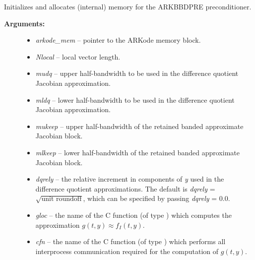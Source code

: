 \documentclass[letterpaper,10pt,english]{sphinxmanual}
\begin{document}
\begin{fulllineitems}
\label{c_interface/Preconditioners:c.ARKBBDPrecInit}
Initializes and allocates (internal) memory for the
ARKBBDPRE preconditioner.
\begin{description}
\item[{\textbf{Arguments:}}] \leavevmode\begin{itemize}
\item {} 
\emph{arkode\_mem} -- pointer to the ARKode memory block.

\item {} 
\emph{Nlocal} -- local vector length.

\item {} 
\emph{mudq} -- upper half-bandwidth to be used in the difference
quotient Jacobian approximation.

\item {} 
\emph{mldq} -- lower half-bandwidth to be used in the difference
quotient Jacobian approximation.

\item {} 
\emph{mukeep} -- upper half-bandwidth of the retained banded
approximate Jacobian block.

\item {} 
\emph{mlkeep} -- lower half-bandwidth of the retained banded
approximate Jacobian block.

\item {} 
\emph{dqrely} -- the relative increment in components of \emph{y} used in
the difference quotient approximations.  The default is \emph{dqrely}
= \(\sqrt{\text{unit roundoff}}\), which can be specified by
passing \emph{dqrely} = 0.0.

\item {} 
\emph{gloc} -- the name of the C function (of type {\hyperref[c_interface/Preconditioners:c.ARKLocalFn]{\emph{}}})
which computes the approximation \(g(t,y) \approx f_I(t,y)\).

\item {} 
\emph{cfn} -- the name of the C function (of type {\hyperref[c_interface/Preconditioners:c.ARKCommFn]{\emph{}}}) which
performs all interprocess communication required for the
computation of \(g(t,y)\).


\end{itemize}
\end{description}
\end{fulllineitems}
\end{document}
